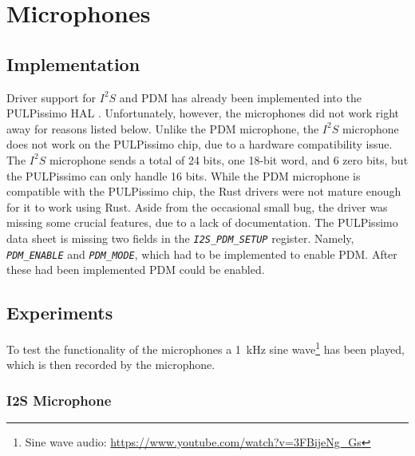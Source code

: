 

\section{Microphones}

\subsection{Implementation}

Driver support for $I^2S$ and PDM has already been implemented into the PULPissimo HAL \cite[Cha 4.3.7]{rust_pulp}.
Unfortunately, however, the microphones did not work right away for reasons listed below.
Unlike the PDM microphone, the $I^2S$ microphone does not work on the PULPissimo chip, due to a hardware compatibility issue.
The $I^2S$ microphone sends a total of 24 bits, one 18-bit word, and 6 zero bits, but the PULPissimo can only handle 16 bits.
While the PDM microphone is compatible with the PULPissimo chip, the Rust drivers were not mature enough for it to work using Rust.
Aside from the occasional small bug, the driver was missing some crucial features, due to a lack of documentation.
The PULPissimo data sheet \cite[Cha 4.8.67]{pulpissimo_datasheet} is missing two fields in the \emph{\lstinline{I2S_PDM_SETUP}} register.
Namely, \emph{\lstinline{PDM_ENABLE}} and \emph{\lstinline{PDM_MODE}}, which had to be implemented to enable PDM.
After these had been implemented PDM could be enabled.

\subsection{Experiments}

To test the functionality of the microphones a \SI{1}{\kilo\hertz} sine wave\footnote{Sine wave audio: \url{https://www.youtube.com/watch?v=3FBijeNg_Gs}}
has been played, which is then recorded by the microphone.

\subsubsection{I2S Microphone}

